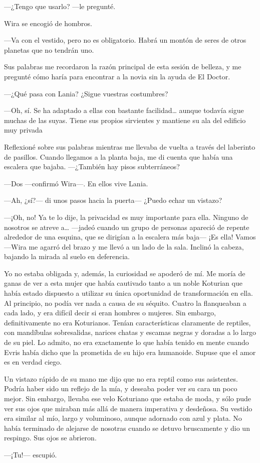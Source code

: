 ---¿Tengo que usarlo? ---le pregunté.

Wira se encogió de hombros.

---Va con el vestido, pero no es obligatorio. Habrá un montón de seres
de otros planetas que no tendrán uno.

Sus palabras me recordaron la razón principal de esta sesión de belleza,
y me pregunté cómo haría para encontrar a la novia sin la ayuda de El
Doctor.

---¿Qué pasa con Lania? ¿Sigue vuestras costumbres?

---Oh, sí. Se ha adaptado a ellas con bastante facilidad\ldots{} aunque
todavía sigue muchas de las suyas. Tiene sus propios sirvientes y
mantiene su ala del edificio muy privada

Reflexioné sobre sus palabras mientras me llevaba de vuelta a través del
laberinto de pasillos. Cuando llegamos a la planta baja, me di cuenta
que había una escalera que bajaba. ---¿También hay pisos subterráneos?

---Dos ---confirmó Wira---. En ellos vive Lania.

---Ah, ¿sí?--- di unos pasos hacia la puerta--- ¿Puedo echar un vistazo?

---¡Oh, no! Ya te lo dije, la privacidad es muy importante para ella.
Ninguno de nosotros se atreve a\ldots{} ---jadeó cuando un grupo de
personas apareció de repente alrededor de una esquina, que se dirigían a
la escalera más baja--- ¡Es ella! Vamos ---Wira me agarró del brazo y me
llevó a un lado de la sala. Inclinó la cabeza, bajando la mirada al
suelo en deferencia.

Yo no estaba obligada y, además, la curiosidad se apoderó de mí. Me
moría de ganas de ver a esta mujer que había cautivado tanto a un noble
Koturian que había estado dispuesto a utilizar su única oportunidad de
transformación en ella. Al principio, no podía ver nada a causa de su
séquito. Cuatro la flanqueaban a cada lado, y era difícil decir si eran
hombres o mujeres. Sin embargo, definitivamente no era Koturianos.
Tenían características claramente de reptiles, con mandíbulas
sobresalidas, narices chatas y escamas negras y doradas a lo largo de su
piel. Lo admito, no era exactamente lo que había tenido en mente cuando
Evris había dicho que la prometida de su hijo era humanoide. Supuse que
el amor es en verdad ciego.

Un vistazo rápido de su mano me dijo que no era reptil como sus
asistentes. Podría haber sido un reflejo de la mía, y deseaba poder ver
su cara un poco mejor. Sin embargo, llevaba ese velo Koturiano que
estaba de moda, y sólo pude ver sus ojos que miraban más allá de manera
imperativa y desdeñosa. Su vestido era similar al mío, largo y
voluminoso, aunque adornado con azul y plata. No había terminado de
alejarse de nosotras cuando se detuvo bruscamente y dio un respingo. Sus
ojos se abrieron.

---¡Tu!--- escupió.